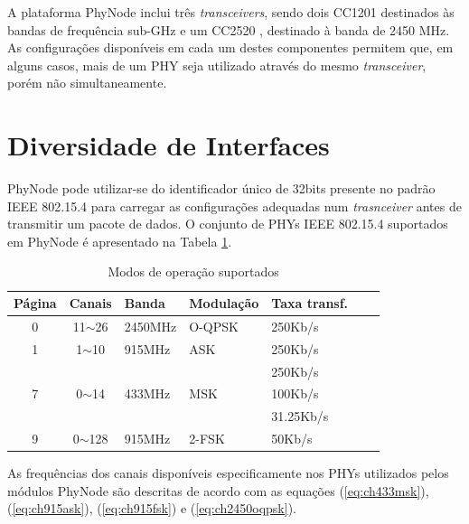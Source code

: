 \documentclass[
	12pt,				%
	openright,			%
	oneside,
	a4paper,			%
	english,			%
	french,				%
	spanish,			%
	brazil				%
	]{abntex2}
\begin{document}

A plataforma PhyNode inclui três \textit{transceivers}, sendo dois CC1201 \cite{bibid} destinados às bandas de frequência sub-GHz e um CC2520 \cite{bibid}, destinado à banda de 2450 MHz. As configurações disponíveis em cada um destes componentes permitem que, em alguns casos, mais de um PHY seja utilizado através do mesmo \textit{transceiver}, porém  não simultaneamente.
	\section{Diversidade de Interfaces}
	PhyNode pode utilizar-se do identificador único de 32bits presente no padrão IEEE 802.15.4 para carregar as configurações adequadas num \textit{trasnceiver} antes de transmitir um pacote de dados. O conjunto de PHYs IEEE 802.15.4 suportados em PhyNode é apresentado na Tabela \ref{tab:modos_opr}.
	
	\begin{table}[h]
		\centering
		\begin{tabular}{|c|c|l|l|l|l|l|}
			\hline
			\textbf{Página}    & \multicolumn{1}{l|}{\textbf{Canais}}   & \textbf{Banda}          & \textbf{Modulação}   & \textbf{Taxa transf.} \\ \hline
			0                  & 11$\sim$26                             & 2450MHz                 & O-QPSK               & 250Kb/s               \\ \hline
			1                  & 1$\sim$10                              & 915MHz                  & ASK                  & 250Kb/s               \\ \hline
			\multirow{3}{*}{7} & \multirow{3}{*}{0$\sim$14}             & \multirow{3}{*}{433MHz} & \multirow{3}{*}{MSK} & 250Kb/s               \\
			&                                        &                         &                      & 100Kb/s               \\
			&                                        &                         &                      & 31.25Kb/s             \\ \hline
			9                  & 0$\sim$128                             & 915MHz                  & 2-FSK                & 50Kb/s                \\ \hline 
		\end{tabular}
		\caption{Modos de operação suportados}
		\label{tab:modos_opr}
	\end{table}
	
	As frequências dos canais disponíveis especificamente nos PHYs utilizados pelos módulos PhyNode são  descritas de acordo com as equações (\ref{eq:ch433msk}), (\ref{eq:ch915ask}), (\ref{eq:ch915fsk}) e (\ref{eq:ch2450oqpsk}).
	
\end{document}
